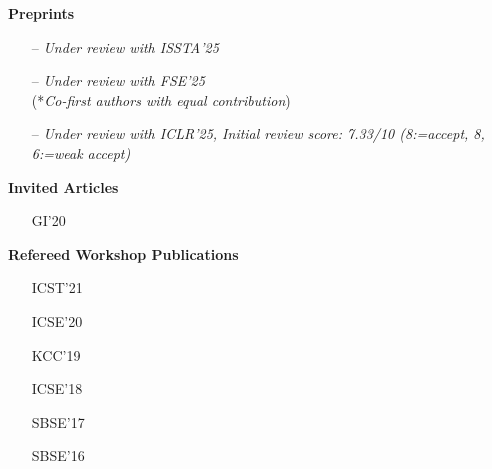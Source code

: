 \documentclass[letterpaper,11pt]{article}
\begin{document}
\newpage

\textbf{Preprints}\vspace{-4pt}
\begin{itemize}[leftmargin=2cm]
  \item[]  -- \emph{Under review with ISSTA'25}
  \item[]  -- \emph{Under review with FSE'25} \\ (*\emph{Co-first authors with equal contribution})
  \item[]  -- \emph{Under review with ICLR'25, Initial review score: 7.33/10 (8:=accept, 8, 6:=weak accept)}
\end{itemize}

\textbf{Invited Articles}\vspace{-4pt}
\begin{itemize}[leftmargin=2cm]
  \item[GI'20] 
\end{itemize}

\textbf{Refereed Workshop Publications}\vspace{-4pt}
\begin{itemize}[leftmargin=2cm]
  \item[ICST'21] 
  \item[ICSE'20] 
  \item[KCC'19] 
  \item[ICSE'18] 
  \item[SBSE'17] 
  \item[SBSE'16] 
\end{itemize}

\end{document}
